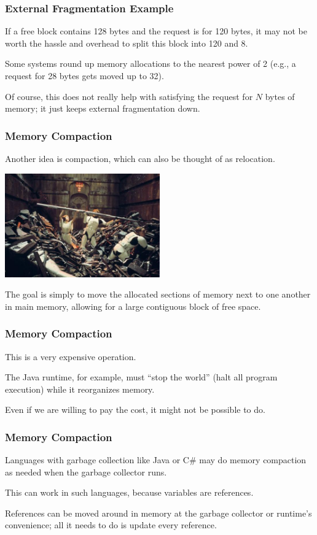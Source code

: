 \begin{frame}
\frametitle{External Fragmentation Example}

If a free block contains 128 bytes and the request is for 120 bytes, it may not be worth the hassle and overhead to split this block into 120 and 8. 

Some systems round up memory allocations to the nearest power of 2 (e.g., a request for 28 bytes gets moved up to 32). 

Of course, this does not really help with satisfying the request for $N$ bytes of memory; it just keeps external fragmentation down.

\end{frame}

\begin{frame}
\frametitle{Memory Compaction}

Another idea is \alert{compaction}, which can also be thought of as \alert{relocation}. 

\begin{center}
	\includegraphics[width=0.5\textwidth]{images/compactor.jpg}
\end{center}

The goal is simply to move the allocated sections of memory next to one another in main memory, allowing for a large contiguous block of free space. 

\end{frame}

\begin{frame}
\frametitle{Memory Compaction}

This is a very expensive operation. 

The Java runtime, for example, must ``stop the world'' (halt all program execution) while it reorganizes memory. 

Even if we are willing to pay the cost, it might not be possible to do.

\end{frame}

\begin{frame}
\frametitle{Memory Compaction}

Languages with garbage collection like Java or C\# may do memory compaction as needed when the garbage collector runs.

This can work in such languages, because variables are references.

References can be moved around in memory at the garbage collector or runtime's convenience; all it needs to do is update every reference.

\end{frame}

